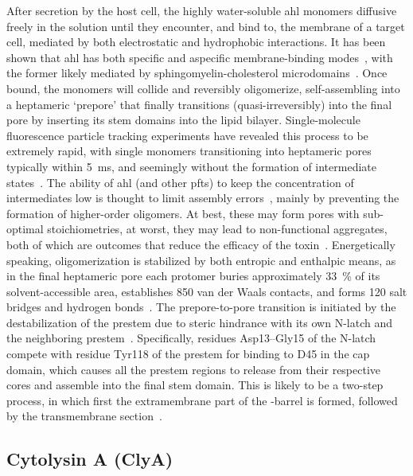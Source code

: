 After secretion by the host cell, the highly water-soluble \gls{ahl} monomers diffusive freely in the solution
until they encounter, and bind to, the membrane of a target cell, mediated by both electrostatic and
hydrophobic interactions. It has been shown that \gls{ahl} has both specific and aspecific membrane-binding
modes~\cite{Hildebrand-1991}, with the former likely mediated by sphingomyelin-cholesterol
microdomains~\cite{Valeva-2006}. Once bound, the monomers will collide and reversibly oligomerize,
self-assembling into a heptameric `prepore' that finally transitions (quasi-irreversibly) into the final pore
by inserting its stem domains into the lipid bilayer. Single-molecule fluorescence particle tracking
experiments have revealed this process to be extremely rapid, with single monomers transitioning into
heptameric pores typically within \SI{5}{\ms}, and seemingly without the formation of intermediate
states~\cite{Thompson-2011}. The ability of \gls{ahl} (and other \glspl{pft}) to keep the concentration of
intermediates low is thought to limit assembly errors~\cite{Lee-2016b}, mainly by preventing the formation of
higher-order oligomers. At best, these may form pores with sub-optimal stoichiometries, at worst, they may
lead to non-functional aggregates, both of which are outcomes that reduce the efficacy of the
toxin~\cite{Fahie-2013,Subburaj-2015}. Energetically speaking, oligomerization is stabilized by both entropic
and enthalpic means, as in the final heptameric pore each protomer buries approximately \SI{33}{\percent} of
its solvent-accessible area, establishes 850 van der Waals contacts, and forms 120 salt bridges and hydrogen
bonds~\cite{Song-1996}. The prepore-to-pore transition is initiated by the destabilization of the prestem due to
steric hindrance with its own N-latch and the neighboring prestem~\cite{Sugawara-2015}. Specifically, residues
Asp13--Gly15 of the N-latch compete with residue Tyr118 of the prestem for binding to D45 in the cap domain,
which causes all the prestem regions to release from their respective cores and assemble into the final stem
domain. This is likely to be a two-step process, in which first the extramembrane part of the \tb-barrel is
formed, followed by the transmembrane section~\cite{Sugawara-2015}.



\subsection{Cytolysin A (ClyA)}
%
\label{sec:np:clya}
%

